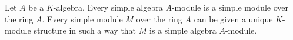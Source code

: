 Let $A$ be a $K$-algebra. Every simple algebra $A$-module is a simple module over the ring $A$. Every simple module $M$ over the ring $A$ can be given a unique $K$-module structure in such a way that $M$ is a simple algebra $A$-module.
